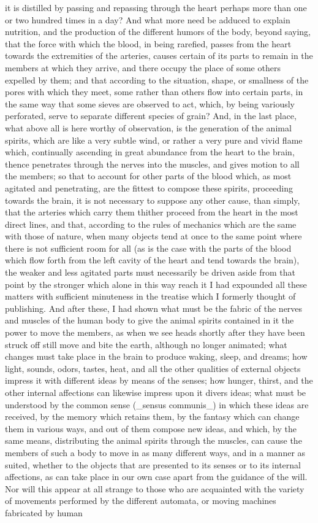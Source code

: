 \documentclass[12pt]{article}
\begin{document}
it is distilled by passing and repassing through the heart perhaps more than one or two hundred times in a day? And what more need be adduced to explain nutrition, and the production of the different humors of the body, beyond saying, that the force with which the blood, in being rarefied, passes from the heart towards the extremities of the arteries, causes certain of its parts to remain in the members at which they arrive, and there occupy the place of some others expelled by them; and that according to the situation, shape, or smallness of the pores with which they meet, some rather than others flow into certain parts, in the same way that some sieves are observed to act, which, by being variously perforated, serve to separate different species of grain? And, in the last place, what above all is here worthy of observation, is the generation of the animal spirits, which are like a very subtle wind, or rather a very pure and vivid flame which, continually ascending in great abundance from the heart to the brain, thence penetrates through the nerves into the muscles, and gives motion to all the members; so that to account for other parts of the blood which, as most agitated and penetrating, are the fittest to compose these spirits, proceeding towards the brain, it is not necessary to suppose any other cause, than simply, that the arteries which carry them thither proceed from the heart in the most direct lines, and that, according to the rules of mechanics which are the same with those of nature, when many objects tend at once to the same point where there is not sufficient room for all (as is the case with the parts of the blood which flow forth from the left cavity of the heart and tend towards the brain), the weaker and less agitated parts must necessarily be driven aside from that point by the stronger which alone in this way reach it I had expounded all these matters with sufficient minuteness in the treatise which I formerly thought of publishing. And after these, I had shown what must be the fabric of the nerves and muscles of the human body to give the animal spirits contained in it the power to move the members, as when we see heads shortly after they have been struck off still move and bite the earth, although no longer animated; what changes must take place in the brain to produce waking, sleep, and dreams; how light, sounds, odors, tastes, heat, and all the other qualities of external objects impress it with different ideas by means of the senses; how hunger, thirst, and the other internal affections can likewise impress upon it divers ideas; what must be understood by the common sense (\_sensus communis\_) in which these ideas are received, by the memory which retains them, by the fantasy which can change them in various ways, and out of them compose new ideas, and which, by the same means, distributing the animal spirits through the muscles, can cause the members of such a body to move in as many different ways, and in a manner as suited, whether to the objects that are presented to its senses or to its internal affections, as can take place in our own case apart from the guidance of the will. Nor will this appear at all strange to those who are acquainted with the variety of movements performed by the different automata, or moving machines fabricated by human 
\end{document}
